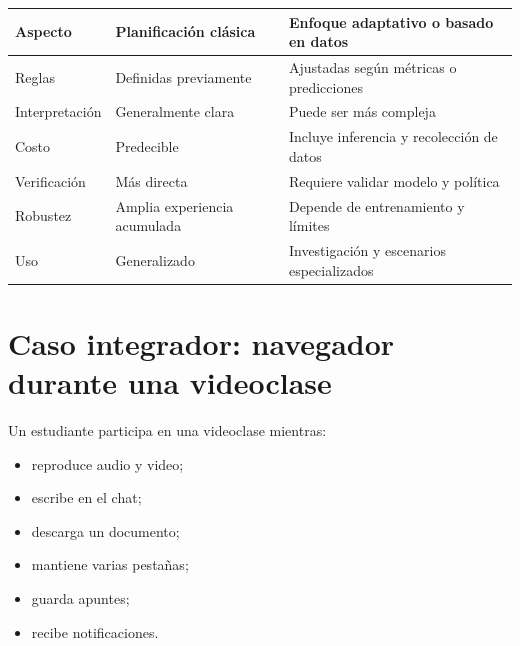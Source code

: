 \documentclass[
  spanish,
  letterpaper,
]{scrbook}
\newcounter{none} %
\providecommand{\tightlist}{%
  \setlength{\itemsep}{0pt}\setlength{\parskip}{0pt}}
\begin{document}
{\def\LTcaptype{none} %
\begin{longtable}[]{@{}
  >{\raggedright\arraybackslash}p{}
  >{\raggedright\arraybackslash}p{}
  >{\raggedright\arraybackslash}p{}@{}}
\toprule\noalign{}
\begin{minipage}[b]{\linewidth}\raggedright
Aspecto
\end{minipage} & \begin{minipage}[b]{\linewidth}\raggedright
Planificación clásica
\end{minipage} & \begin{minipage}[b]{\linewidth}\raggedright
Enfoque adaptativo o basado en datos
\end{minipage} \\
\midrule\noalign{}
\endhead
\bottomrule\noalign{}
\endlastfoot
Reglas & Definidas previamente & Ajustadas según métricas o
predicciones \\
Interpretación & Generalmente clara & Puede ser más compleja \\
Costo & Predecible & Incluye inferencia y recolección de datos \\
Verificación & Más directa & Requiere validar modelo y política \\
Robustez & Amplia experiencia acumulada & Depende de entrenamiento y
límites \\
Uso & Generalizado & Investigación y escenarios especializados \\
\end{longtable}
}


\chapter{Caso integrador: navegador durante una
videoclase}\label{caso-integrador-navegador-durante-una-videoclase}

Un estudiante participa en una videoclase mientras:

\begin{itemize}
\tightlist
\item
  reproduce audio y video;
\item
  escribe en el chat;
\item
  descarga un documento;
\item
  mantiene varias pestañas;
\item
  guarda apuntes;
\item
  recibe notificaciones.
\end{itemize}
\end{document}
